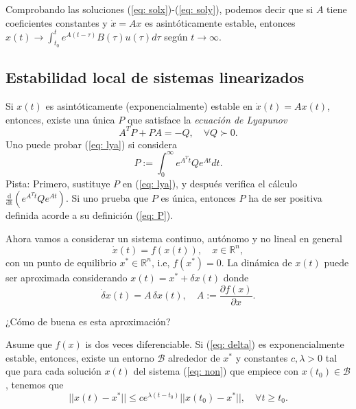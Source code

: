 Comprobando las soluciones (\ref{eq: solx})-(\ref{eq: soly}), podemos decir que si $A$ tiene coeficientes constantes y $\dot x = Ax$ es asintóticamente estable, entonces $x(t) \to \int_{t_0}^t e^{A(t-\tau)}B(\tau)u(\tau)d\tau$ según $t\to\infty$. 

\subsection{Estabilidad local de sistemas linearizados}\label{lyapulin}
Si $x(t)$ es asintóticamente (exponencialmente) estable en $\dot x(t) = Ax(t)$, entonces, existe una única $P$ que satisface la \emph{ecuación de Lyapunov}
\begin{equation}
A^TP + PA = -Q, \quad \forall Q \succ 0.
	\label{eq: lya}
\end{equation}
Uno puede probar (\ref{eq: lya}) si considera
\begin{equation}
	P:= \int_0^\infty e^{A^Tt}Qe^{At}dt.
	\label{eq: P}
\end{equation}
Pista: Primero, sustituye $P$ en (\ref{eq: lya}), y después verifica el cálculo  $\frac{\mathrm{d}}{\mathrm{dt}}\left(e^{A^Tt}Qe^{At}\right)$. Si uno prueba que $P$ es única, entonces $P$ ha de ser positiva definida acorde a su definición (\ref{eq: P}).

Ahora vamos a considerar un sistema continuo, autónomo y no lineal en general
\begin{equation}
	\dot x(t) = f(x(t)), \quad x\in\mathbb{R}^n,
	\label{eq: non}
\end{equation}
con un punto de equilibrio $x^*\in\mathbb{R}^n$, i.e, $f(x^*) = 0$. La dinámica de $x(t)$ puede ser aproximada considerando $x(t) = x^* + \delta x(t)$ donde 
\begin{equation}
	\dot{\delta} x(t) = A\,\delta x(t), \quad A:=\frac{\partial f(x)}{\partial x}.
	\label{eq: delta}
\end{equation}

¿Cómo de buena es esta aproximación?

\begin{theorem}
	\label{thm: tayl}
	Asume que $f(x)$ is dos veces diferenciable. Si (\ref{eq: delta}) es exponencialmente estable, entonces, existe un entorno $\mathcal{B}$ alrededor de $x^*$ y constantes $c, \lambda > 0$ tal que para cada solución $x(t)$ del sistema (\ref{eq: non}) que empiece con $x(t_0)\in\mathcal{B}$, tenemos que
	\begin{equation}
	||x(t) - x^*|| \leq ce^{\lambda(t-t_0)} ||x(t_0) - x^*||, \quad \forall t\geq t_0.
	\end{equation}
\end{theorem}


